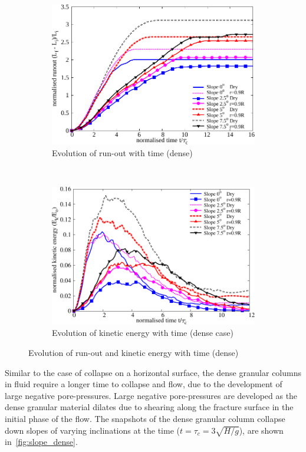 \begin{figure}
\centering
\begin{subfigure}[t]{0.95\textwidth}
\centering
\includegraphics[width=0.95\columnwidth]{Runout_dense_slope}
\caption{Evolution of run-out with time (dense)}
\label{fig:run_dense}
\end{subfigure}\\
\begin{subfigure}[t]{0.95\textwidth}
\centering
\includegraphics[width=0.95\columnwidth]{KE_dense_slope}
\caption{Evolution of kinetic energy with time (dense case)}
\label{fig:KE_dense}
\end{subfigure}
\caption{Evolution of run-out and kinetic energy with time (dense)}
\label{fig:run_KE_dense}
\end{figure}

Similar to the case of collapse on a horizontal surface, the dense granular 
columns 
in fluid require a longer time to collapse and flow, due to the development of 
large negative pore-pressures. Large negative pore-pressures are developed as 
the 
dense granular material dilates due to shearing along the fracture surface in 
the initial phase of the flow. The snapshots of the dense granular column 
collapse down slopes of varying inclinations at the time 
($t=\tau_{c}=3\sqrt{H/g}$), are shown in~\cref{fig:slope_dense}.

